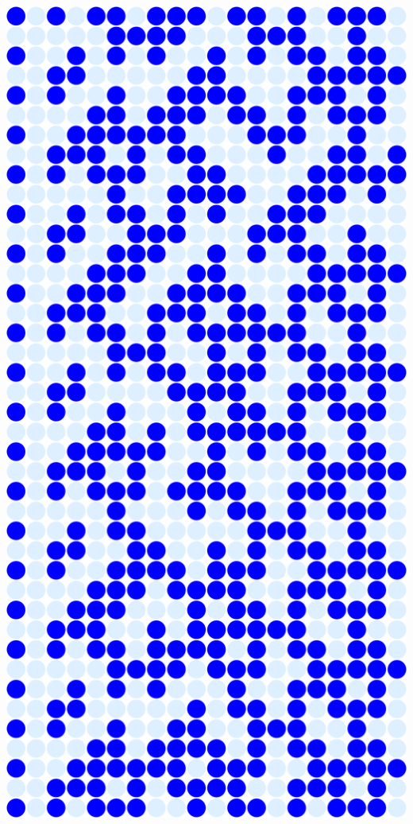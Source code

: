 \documentclass{beamer}
\begin{document}
\begin{frame}
\frametitle{}
\begin{center}
  \includegraphics[scale=0.025]{pebbles-orbit}
\end{center}
\end{frame}
\end{document}
